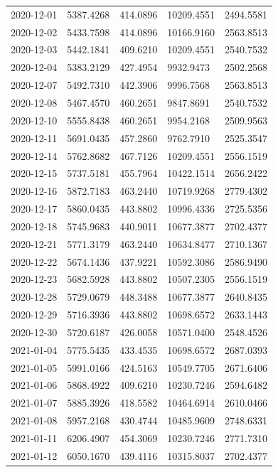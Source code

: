 \begin{footnotesize}
\begin{longtable}{lllll}
2020-12-01 & 5387.4268 & 414.0896 & 10209.4551 & 2494.5581 \\
2020-12-02 & 5433.7598 & 414.0896 & 10166.9160 & 2563.8513 \\
2020-12-03 & 5442.1841 & 409.6210 & 10209.4551 & 2540.7532 \\
2020-12-04 & 5383.2129 & 427.4954 & 9932.9473 & 2502.2568 \\
2020-12-07 & 5492.7310 & 442.3906 & 9996.7568 & 2563.8513 \\
2020-12-08 & 5467.4570 & 460.2651 & 9847.8691 & 2540.7532 \\
2020-12-10 & 5555.8438 & 460.2651 & 9954.2168 & 2509.9563 \\
2020-12-11 & 5691.0435 & 457.2860 & 9762.7910 & 2525.3547 \\
2020-12-14 & 5762.8682 & 467.7126 & 10209.4551 & 2556.1519 \\
2020-12-15 & 5737.5181 & 455.7964 & 10422.1514 & 2656.2422 \\
2020-12-16 & 5872.7183 & 463.2440 & 10719.9268 & 2779.4302 \\
2020-12-17 & 5860.0435 & 443.8802 & 10996.4336 & 2725.5356 \\
2020-12-18 & 5745.9683 & 440.9011 & 10677.3877 & 2702.4377 \\
2020-12-21 & 5771.3179 & 463.2440 & 10634.8477 & 2710.1367 \\
2020-12-22 & 5674.1436 & 437.9221 & 10592.3086 & 2586.9490 \\
2020-12-23 & 5682.5928 & 443.8802 & 10507.2305 & 2556.1519 \\
2020-12-28 & 5729.0679 & 448.3488 & 10677.3877 & 2640.8435 \\
2020-12-29 & 5716.3936 & 443.8802 & 10698.6572 & 2633.1443 \\
2020-12-30 & 5720.6187 & 426.0058 & 10571.0400 & 2548.4526 \\
2021-01-04 & 5775.5435 & 433.4535 & 10698.6572 & 2687.0393 \\
2021-01-05 & 5991.0166 & 424.5163 & 10549.7705 & 2671.6406 \\
2021-01-06 & 5868.4922 & 409.6210 & 10230.7246 & 2594.6482 \\
2021-01-07 & 5885.3926 & 418.5582 & 10464.6914 & 2610.0466 \\
2021-01-08 & 5957.2168 & 430.4744 & 10485.9609 & 2748.6331 \\
2021-01-11 & 6206.4907 & 454.3069 & 10230.7246 & 2771.7310 \\
2021-01-12 & 6050.1670 & 439.4116 & 10315.8037 & 2702.4377 \\

\end{longtable}
\end{footnotesize}
